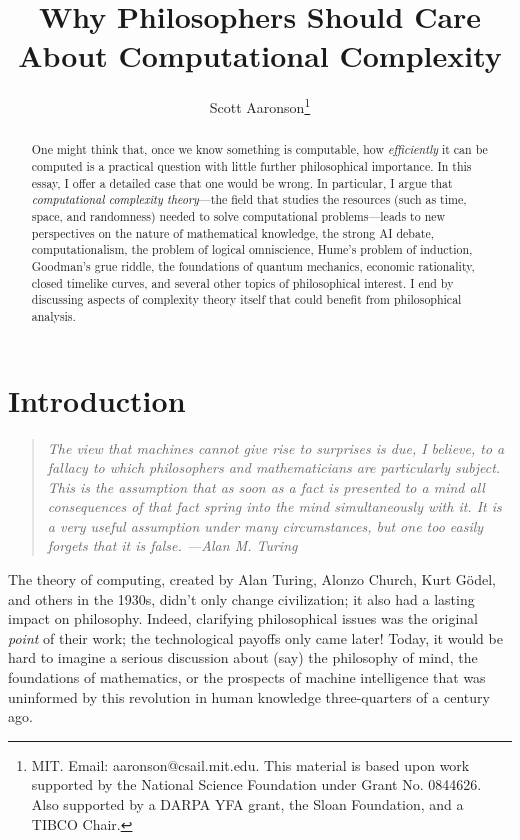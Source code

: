 \documentclass[12pt,onecolumn]{article}%
\begin{document}
\title{Why Philosophers Should Care About Computational Complexity}
\author{Scott Aaronson\thanks{MIT. Email: aaronson@csail.mit.edu. This material
is based upon work supported by the National Science Foundation under Grant
No. 0844626. Also supported by a DARPA YFA grant, the Sloan Foundation, and
a TIBCO Chair.}}
\date{}
\maketitle

\begin{abstract}
One might think that, once we know something is computable, how
\textit{efficiently} it can be computed is a practical question with little
further philosophical importance. In this essay, I offer a detailed case
that one would be wrong. In particular, I argue that \textit{computational
complexity theory}---the field that studies the resources (such as time,
space, and randomness) needed to solve computational problems---leads to new
perspectives on the nature of mathematical knowledge, the strong AI debate,
computationalism, the problem of logical omniscience, Hume's problem of
induction, Goodman's grue riddle, the foundations of quantum mechanics,
economic rationality, closed timelike curves, and several other topics of
philosophical interest. I end by discussing aspects of complexity theory
itself that could benefit from philosophical analysis.

\end{abstract}
\tableofcontents

\newpage
\section{Introduction\label{INTRO}}

\begin{quotation}
\noindent\textit{The view that machines cannot give rise to surprises is due,
I believe, to a fallacy to which philosophers and mathematicians are
particularly subject. This is the assumption that as soon as a fact is
presented to a mind all consequences of that fact spring into the mind
simultaneously with it. It is a very useful assumption under many
circumstances, but one too easily forgets that it is false. ---Alan M. Turing
\cite{turing:ai}}
\end{quotation}
The theory of computing, created by Alan Turing, Alonzo Church, Kurt
G\"{o}del, and others in the 1930s, didn't only change civilization; it also
had a lasting impact on philosophy. Indeed, clarifying philosophical issues
was the original \textit{point} of their work; the technological payoffs only
came later! Today, it would be hard to imagine a serious discussion about
(say) the philosophy of mind, the foundations of mathematics, or the prospects
of machine intelligence that was uninformed by this revolution in human
knowledge three-quarters of a century ago.
\end{document}
